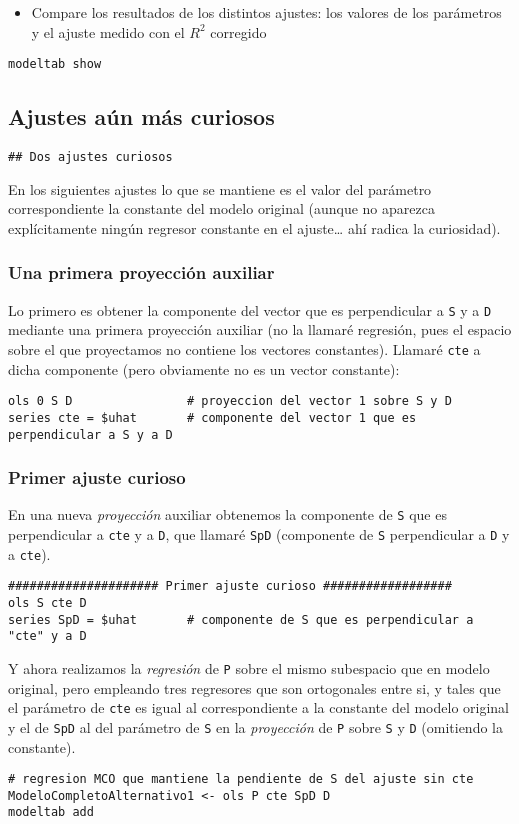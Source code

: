 \documentclass[11pt]{article}
\begin{document}
\begin{itemize}
\item Compare los resultados de los distintos ajustes: los valores de los
parámetros y el ajuste medido con el \(R^2\) corregido
\end{itemize}

\begin{verbatim}
modeltab show
\end{verbatim}

\subsection{Ajustes aún más curiosos}
\label{sec:org65729cf}
\begin{verbatim}
## Dos ajustes curiosos 
\end{verbatim}
En los siguientes ajustes lo que se mantiene es el valor del parámetro
correspondiente la constante del modelo original (aunque no aparezca
explícitamente ningún regresor constante en el ajuste\ldots{} ahí radica la
curiosidad).

\subsubsection{Una primera proyección auxiliar}
\label{sec:orgd8782c3}
Lo primero es obtener la componente del vector  que es
perpendicular a \texttt{S} y a \texttt{D} mediante una primera proyección auxiliar
(no la llamaré regresión, pues el espacio sobre el que proyectamos no
contiene los vectores constantes). Llamaré \texttt{cte} a dicha componente
(pero obviamente no es un vector constante):
\begin{verbatim}
ols 0 S D                # proyeccion del vector 1 sobre S y D
series cte = $uhat       # componente del vector 1 que es perpendicular a S y a D
\end{verbatim}


\subsubsection{Primer ajuste curioso}
\label{sec:orgdb80fae}
En una nueva \emph{proyección} auxiliar obtenemos la componente de \texttt{S} que
es perpendicular a \texttt{cte} y a \texttt{D}, que llamaré \texttt{SpD} (componente de \texttt{S}
perpendicular a \texttt{D} y a \texttt{cte}).
\begin{verbatim}
##################### Primer ajuste curioso ##################
ols S cte D
series SpD = $uhat       # componente de S que es perpendicular a "cte" y a D
\end{verbatim}
Y ahora realizamos la \emph{regresión} de \texttt{P} sobre el mismo subespacio que
en modelo original, pero empleando tres regresores que son ortogonales
entre si, y tales que el parámetro de \texttt{cte} es igual al
correspondiente a la constante del modelo original y el de \texttt{SpD} al
del parámetro de \texttt{S} en la \emph{proyección} de \texttt{P} sobre \texttt{S} y \texttt{D}
(omitiendo la constante).
\begin{verbatim}
# regresion MCO que mantiene la pendiente de S del ajuste sin cte
ModeloCompletoAlternativo1 <- ols P cte SpD D 
modeltab add 
\end{verbatim}
\end{document}
